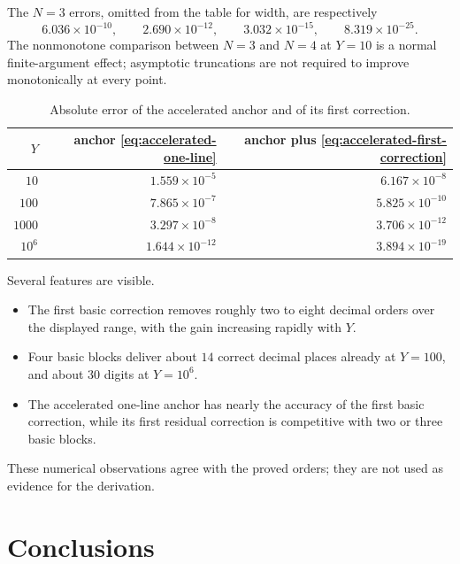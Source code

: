 \documentclass[11pt,oneside]{article}
\theoremstyle{plain}
\theoremstyle{definition}
\theoremstyle{remark}
\begin{document}
The \(N=3\) errors, omitted from the table for width, are respectively
\begin{equation}
 6.036\times10^{-10},\qquad
 2.690\times10^{-12},\qquad
 3.032\times10^{-15},\qquad
 8.319\times10^{-25}.
 \label{eq:N3-errors}
\end{equation}
The nonmonotone comparison between \(N=3\) and \(N=4\) at \(Y=10\) is a
normal finite-argument effect; asymptotic truncations are not required to
improve monotonically at every point.

\begin{table}[htbp]
\centering
\small
\caption{Absolute error of the accelerated anchor and of its first correction.}
\label{tab:accelerated-errors}
\begin{tabular}{@{}rrr@{}}
\toprule
\(Y\) & anchor \cref{eq:accelerated-one-line}
& anchor plus \cref{eq:accelerated-first-correction} \\
\midrule
\(10\)    & \(1.559\times10^{-5}\)  & \(6.167\times10^{-8}\) \\
\(100\)   & \(7.865\times10^{-7}\)  & \(5.825\times10^{-10}\) \\
\(1000\)  & \(3.297\times10^{-8}\)  & \(3.706\times10^{-12}\) \\
\(10^6\)  & \(1.644\times10^{-12}\) & \(3.894\times10^{-19}\) \\
\bottomrule
\end{tabular}
\end{table}

Several features are visible.
\begin{itemize}
 \item The first basic correction removes roughly two to eight decimal orders
       over the displayed range, with the gain increasing rapidly with \(Y\).
 \item Four basic blocks deliver about \(14\) correct decimal places already at
       \(Y=100\), and about \(30\) digits at \(Y=10^6\).
 \item The accelerated one-line anchor has nearly the accuracy of the first
       basic correction, while its first residual correction is competitive
       with two or three basic blocks.
\end{itemize}
These numerical observations agree with the proved orders; they are not used
as evidence for the derivation.

\section{Conclusions}
\label{sec:conclusion}
\end{document}
